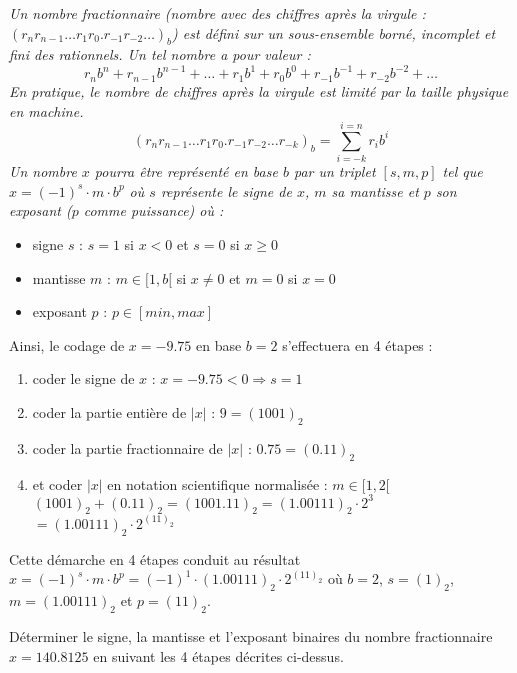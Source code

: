 \begin{td}\label{td:fraction}
\em
Un nombre fractionnaire ({\em nombre avec des chiffres après la virgule} :
{$(r_nr_{n-1}\ldots r_1r_0.r_{-1}r_{-2}\ldots)_b$})
est défini sur un sous-en\-semble borné, incomplet et fini des rationnels.
Un tel nombre a pour valeur :
$${r_nb^n + r_{n-1}b^{n-1} + \ldots + r_1b^1 + r_0b^0 + r_{-1}b^{-1} + r_{-2}b^{-2} + \ldots}$$
En pratique, le {\em nombre de chiffres après la virgule} est limité par la taille physique
en machine.
$${(r_nr_{n-1}\ldots r_1r_0.r_{-1}r_{-2}\ldots r_{-k})_b = \sum_{i=-k}^{i=n} r_ib^i}$$
Un nombre $x$ pourra être représenté en base $b$ par un triplet
$[s,m,p]$ tel que ${x = (-1)^s \cdot m \cdot b^p}$ où $s$ représente le signe de $x$,
$m$ sa mantisse et $p$ son exposant ($p$ comme puissance) où :
\begin{itemize}
\item signe $s$ : $s = 1$ si $x < 0$ et $s = 0$ si $x \geq 0$
\item mantisse $m$ : $m \in [1,b[$ si $x \neq 0$ et $m = 0$ si $x = 0$
\item exposant $p$ : $p \in [min,max]$
\end{itemize}
Ainsi, le codage de $x = -9.75$ en base $b = 2$ s'effectuera en 4
étapes :
\begin{enumerate}
\item coder le signe de $x$ : $x = -9.75 < 0 \Rightarrow {s = 1}$
\item coder la partie entière de $|x|$ : {$9 = (1001)_2$}
\item coder la partie fractionnaire de $|x|$ : {$0.75 = (0.11)_2$}
\item et coder $|x|$ en notation scientifique normalisée : $m \in [1,2[$\\
	$(1001)_2 + (0.11)_2 = (1001.11)_2 = (1.00111)_2\cdot 2^{3}$\\ 
	$= {(1.00111)_2\cdot 2^{{(11)}_2}}$
\end{enumerate}
Cette démarche en 4 étapes conduit au résultat $x = (-1)^s \cdot m \cdot b^p = (-1)^{1} \cdot (1.00111)_2 \cdot 2^{(11)_2}$ où
$b = 2$, $s = (1)_2$, $m = (1.00111)_2$  et $p = (11)_2$.

Déterminer le signe, la mantisse et l'exposant binaires 
du nombre fractionnaire $x = 140.8125$ 
en suivant les 4 étapes décrites ci-dessus.
\end{td}


